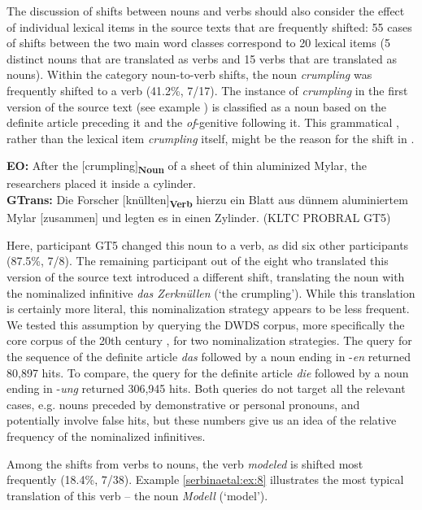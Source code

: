 \documentclass[output=paper]{LSP/langsci}
\begin{document}
The discussion of shifts between nouns and verbs should also consider the effect of individual lexical items in the source texts that are frequently shifted: 55 cases of shifts between the two main word classes correspond to 20 lexical items (5 distinct nouns that are translated as verbs and 15 verbs that are translated as nouns). Within the category noun-to-verb shifts, the noun \textit{crumpling} was frequently shifted to a verb (41.2\%, 7/17). The instance of \textit{crumpling} in the first version of the source text (see example ) is classified as a noun based
on the definite article preceding it and the \textit{of}-genitive following it. This grammatical , rather than the lexical item \textit{crumpling} itself, might be the reason for the shift in . 

\ea \label{serbinaetal:ex:7}
\textbf{EO:} After the $[$crumpling$]$\textsubscript{\textbf{Noun}} of a sheet of thin aluminized Mylar, the researchers placed it inside a cylinder. \\
\textbf{GTrans:} Die Forscher $[$knüllten$]$\textsubscript{\textbf{Verb}} hierzu ein Blatt aus dünnem aluminiertem Mylar [zusammen] und legten es in einen Zylinder. (KLTC PROBRAL GT5)
\z

Here, participant GT5 changed this noun to a  verb, as did six other participants (87.5\%, 7/8). The remaining participant out of the eight who translated this version of the source text introduced a different shift, translating the noun with the nominalized infinitive \textit{das Zerknüllen} (`the crumpling'). While this translation is certainly more literal, this nominalization strategy  appears to be less frequent. We tested this assumption by querying the DWDS corpus, more specifically the core corpus of the 20th century , for two nominalization strategies. The query for the sequence of the definite article \textit{das} followed by a noun ending in -\textit{en} returned 80,897 hits. To compare, the query for the definite article \textit{die} followed by a noun ending in -\textit{ung} returned 306,945 hits. Both queries do not target all the relevant cases, e.g. nouns preceded by demonstrative or personal pronouns, and potentially involve false hits, but these numbers give us an idea of the relative frequency of the nominalized infinitives. 

Among the shifts from verbs to nouns, the verb \textit{modeled} is shifted most frequently (18.4\%, 7/38). Example \ref{serbinaetal:ex:8} illustrates the most typical translation of this verb -- the noun \textit{Modell} (`model'). 
\end{document}
